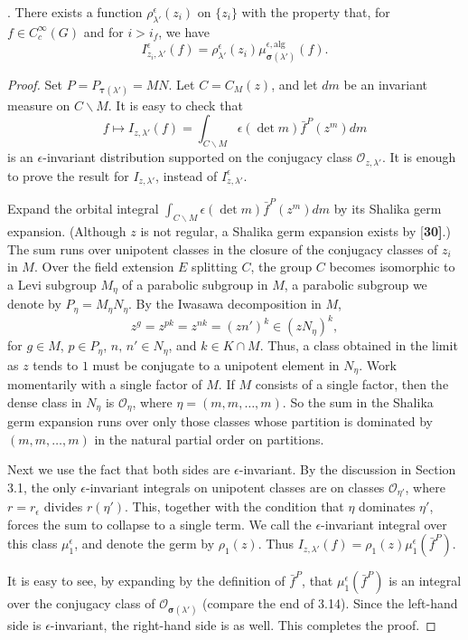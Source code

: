 \documentclass{amsart}
\begin{document}
.  There exists a function $\rho^\epsilon_{\lambda'}(z_i)$
on $\{z_i\}$ with the property that,
for $f\in C_c^\infty(G)$ and for $i>i_f$, we have
$$I^{\epsilon}_{z_i,\lambda'}(f) = 
	\rho^\epsilon_{\lambda'}(z_i)\mu^{\epsilon,\text{alg}}_{\pmb
	\sigma(\lambda')}(f).$$
\finishproclaim

\begin{proof}   Set $P=P_{\pmb\tau(\lambda')} = MN$.  Let $C = C_M(z)$,
and let $dm$ be an invariant measure on $C\backslash M$.  It is easy to
check that
$$f\mapsto I_{z,\lambda'}(f) = \int_{C\backslash M}\epsilon(\det m )\bar f^P(z^m)dm$$
is an $\epsilon$-invariant distribution supported on the conjugacy
class ${\mathcal O}_{z,\lambda'}$. It is enough to prove the
result for $I_{z,\lambda'}$, instead of $I^{\epsilon}_{z,\lambda'}$.

Expand the orbital integral $\int_{C\backslash M}\epsilon(\det m) \bar f^P(z^m) dm$
by its Shalika germ expansion.  (Although $z$ is not regular, 
a Shalika germ expansion exists by {[\bf 30]}.)
The sum runs over unipotent classes in the closure of the conjugacy 
classes of $z_i$ in $M$.  Over the field extension $E$ splitting $C$,
the group $C$ becomes isomorphic to a Levi subgroup $M_\eta$ of a parabolic
subgroup in $M$, a parabolic subgroup we denote by $P_\eta = M_\eta N_\eta$.
By the Iwasawa decomposition in 
  $ M $,
%
$$
  z^g =
  z^{pk}=
  z^{nk} =
 (zn')^k \in 
  (z N_{\eta})^k,
 $$
  for $g \in M$, 
  $p \in P_{\eta}$, $n, \, n' \in N_{\eta}$, and
  $k \in K \cap M$.
Thus, a class obtained in the limit as $z$ tends to $1$ must be conjugate to a unipotent element in
  $ N_{\eta} $.
Work momentarily with a single factor of $M$.
If $ M$
consists of a single factor, then the dense class in $ N_{\eta} $ 
is 
  $ {\mathcal O}_{\eta} $, where $ \eta = ( m, m,\dots ,  m) $.
So the sum in the Shalika germ expansion
runs over only those classes whose partition is dominated 
  by $ (m, m, \dots , m) $
in the
  natural partial order on partitions.

Next we use the fact that both sides are
  $ \epsilon $-invariant.
  By the discussion in Section 3.1, the
only
  $ \epsilon $-invariant 
integrals
on unipotent classes are on classes
  $ \mathcal O_{\eta'} $,
where $r=r_\epsilon$ divides 
  $ r(\eta') $.
This, together with the condition that
  $ \eta $
dominates
  $ \eta' $,
forces the sum to collapse to a single term.
We call the $ \epsilon $-invariant integral over this class
  $ \mu_1^{\epsilon} $, and denote the germ by $ \rho_1 (z) $.  
  Thus $I_{z,\lambda'}(f) = \rho_1(z)\mu_1^\epsilon(\bar f^P)$.

It is easy to see, by expanding
by the definition of
  $ \bar f^{P} $,
that
  $ \mu_1^{\epsilon} 
    \left(
      \bar f^{P} 
    \right) $
is an integral over the conjugacy class of ${\mathcal O}_{\pmb\sigma(\lambda')}$
(compare the end of 3.14).
Since the left-hand side is $\epsilon$-invariant, the right-hand
side is as well.  This completes the proof.
\end{proof}
\bigskip
\end{document}
